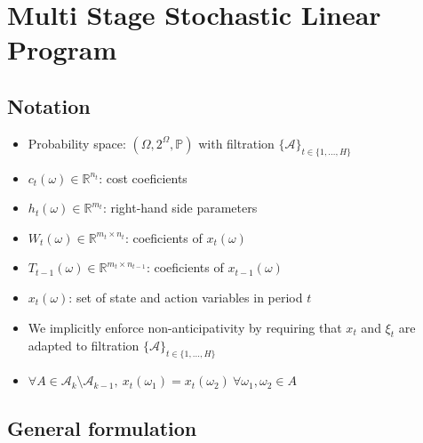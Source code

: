 \documentclass[12pt, openany]{report}
\newcommand{\R}{\mathbb{R}}
\renewcommand{\P}{\mathbb{P}}
\newcommand{\A}{\mathcal{A}}
\theoremstyle{definition}
\begin{document}
\section{Multi Stage Stochastic Linear Program}
\subsection{Notation}
\begin{itemize}
	\item Probability space: $(\Omega, 2^\Omega, \P)$ with filtration $\{\A\}_{t\in \{1, \dots, H\}}$
	\item $c_t(\omega) \in \R^{n_t}$: cost coeficients
	\item $h_t(\omega) \in \R^{m_t}$: right-hand side parameters
	\item $W_t(\omega) \in \R^{m_t \times n_t}$: coeficients of $x_t(\omega)$
	\item $T_{t-1}(\omega) \in \R^{m_t \times n_{t-1}}$: coeficients of $x_{t-1}(\omega)$
	\item $x_t(\omega)$: set of state and action variables in period $t$
	\item We implicitly enforce non-anticipativity by requiring that $x_t$ and $\xi_t$ are adapted to filtration $\{\mathcal{A}\}_{t\in \{1, \dots, H\}}$ 
	\item $\forall A \in \mathcal{A}_k \setminus \mathcal{A}_{k-1}, \: x_t(\omega_1)=x_t(\omega_2) \: \forall\omega_1,\omega_2 \in A$
\end{itemize}
\subsection{General formulation}
\end{document}
